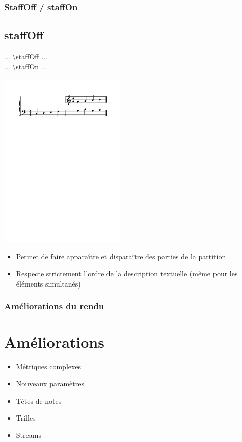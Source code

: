 \documentclass[12pt]{beamer}
\newenvironment{code}
  {\fontfamily{prc}\selectfont}{}
\begin{document}
    \begin{frame}
    \frametitle{StaffOff / staffOn}
    \subsection{staffOff}
    
    \begin{code} ... \textbackslash{}staffOff ... \hspace{1cm} \end{code} \\
    \begin{code} ... \textbackslash{}staffOn ... \end{code}
    
    \begin{center} \includegraphics[width=6cm]{img/staffoff.pdf} \end{center}
    
    \begin{itemize}
      \item Permet de faire apparaître et disparaître des parties de la partition
      \item Respecte strictement l'ordre de la description textuelle (même pour les éléments simultanés)
    \end{itemize}
    
    \end{frame}

    \begin{frame}
    \frametitle{Améliorations du rendu}
    \section{Améliorations}
    
    \large
    
    \begin{itemize}
      \item Métriques complexes
      \item Nouveaux paramètres
      \item Têtes de notes
      \item Trilles
      \item Streams
    \end{itemize}
    
    \end{frame}
\end{document}
